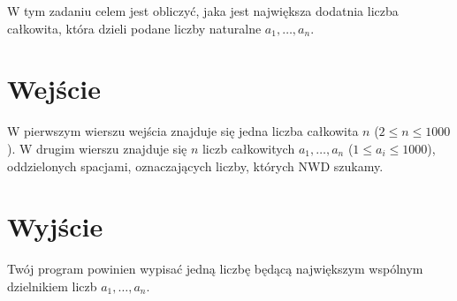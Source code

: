 \documentclass{spiral-kurs}
\begin{document}
\makeheader
%
    W tym zadaniu celem jest obliczyć, jaka jest największa dodatnia liczba całkowita,
    która dzieli podane liczby naturalne $a_1,\ldots,a_n$.

    \section{Wejście}
    W pierwszym wierszu wejścia znajduje się jedna liczba całkowita $n$
    ($2 \le n \le 1000$).
    W drugim wierszu znajduje się $n$ liczb całkowitych $a_1,\ldots,a_n$
    ($1 \le a_i \le 1000$), oddzielonych spacjami, oznaczających liczby,
    których NWD szukamy.

    \section{Wyjście}
    Twój program powinien wypisać jedną liczbę będącą największym wspólnym dzielnikiem
    liczb $a_1,\ldots,a_n$.



  
\end{document}
